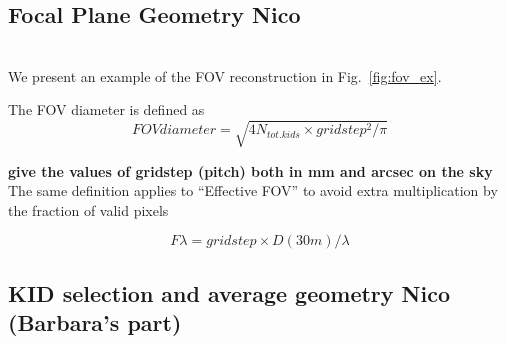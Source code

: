 %
%
%


\subsection{Focal Plane Geometry {\color{blue} Nico}}
\label{se:fov_geometry}

\\

We present an example of the FOV reconstruction in Fig.~\ref{fig:fov_ex}.

The FOV diameter is defined as 
\begin{equation}
FOV diameter = \sqrt{4 N_{tot. kids} \times gridstep^2/\pi}
\end{equation}

{\bf give the values of gridstep (pitch) both in mm and arcsec on the sky}\\

The same definition applies to ``Effective FOV'' to avoid extra multiplication
by the fraction of valid pixels

\begin{equation}
F\lambda = gridstep\times D(30m)/\lambda
\end{equation}




\subsection{KID selection and average geometry {\color{blue} Nico (Barbara's part)} }
\label{avg_kidpar}


